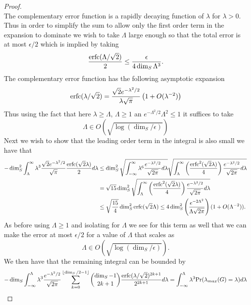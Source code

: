 \documentclass{article}
\begin{document}
\begin{proof}
\begin{equation}
\end{equation}
The complementary error function is a rapidly decaying function of $\lambda$ for $\lambda>0$.  Thus in order to simplify the sum to allow only the first order term in the expansion to dominate we wish to take $\Lambda$ large enough so that the total error is at most $\epsilon/2$ which is implied by taking
\begin{equation}
    \frac{{\rm erfc}(\Lambda/\sqrt{2})}{2} \le \frac{\epsilon}{4\dim_S \Lambda^3}.
\end{equation}
The complementary error function has the following asymptotic expansion
\begin{equation}
    {\rm erfc}(\lambda/\sqrt{2}) = \frac{\sqrt{2}e^{-\lambda^2/2}}{\lambda \sqrt{\pi}}\left( 1 + O(\lambda^{-2}) \right)
\end{equation}
Thus using the fact that here $\lambda\ge \Lambda$, $\Lambda \ge 1$ an $e^{-\Lambda^2/2}\Lambda^2 \le 1$ it suffices to take
\begin{equation}
    \Lambda \in O\left(\sqrt{\log(\dim_S/\epsilon)} \right)
\end{equation}
Next we wish to show that the leading order term in the integral is also small we have that
\begin{align}
    -\dim_S^2\int_{\Lambda}^{\infty}  \lambda^3 \frac{\sqrt{2}e^{-\lambda^2/2}}{\sqrt{\pi}} \frac{{\rm erfc}(\sqrt{2}\lambda)}{2} d\lambda&\le \dim_S^2\sqrt{\int_{-\infty}^\infty \lambda^6 \frac{e^{-\lambda^2/2}}{\sqrt{2\pi}}  d\lambda}\sqrt{\int_\Lambda^\infty\left(\frac{{\rm erfc}^2(\sqrt{2}\lambda)}{4}\right)\frac{e^{-\lambda^2/2}}{\sqrt{2\pi}}  d\lambda }\nonumber\\
    &=\sqrt{15} \dim_S^2 \sqrt{\int_\Lambda^\infty\left(\frac{{\rm erfc}^2(\sqrt{2}\lambda)}{4}\right)\frac{e^{-\lambda^2/2}}{\sqrt{2\pi}}  d\lambda }\nonumber\\
    &\le \sqrt{\frac{15}{4}} \dim_S^2 {\rm erfc}(\sqrt{2}\Lambda) \le 4 \dim_S^2 \left(\frac{e^{-2\Lambda^2}}{\Lambda \sqrt{2\pi}} \right) (1+O(\Lambda^{-2})).
\end{align}
As before using $\Lambda \ge 1$ and isolating for $\Lambda$ we see for this term as well that we can make the error at most $\epsilon/2$ for a value of $\Lambda$ that scales as
\begin{equation}
    \Lambda \in O\left(\sqrt{\log(\dim_S/\epsilon)} \right).
\end{equation}
We then have that the remaining integral can be bounded by
\begin{align}
    -\dim_S\int_{-\infty}^{\Lambda}  \lambda^3 \frac{e^{-\lambda^2/2}}{\sqrt{2\pi}} \sum_{k=0}^{\lfloor \dim_S/2-1\rfloor} \binom{\dim_S-1}{2k+1}\frac{{\rm erfc}(\lambda/\sqrt{2})^{2k+1}}{2^{2k+1}} d\lambda&=  \int_{-\infty}^\Lambda \lambda^3 {\rm Pr}(\lambda_{max}(G) = \lambda) d\lambda \nonumber\\

\end{align}
\end{proof}
\end{document}
